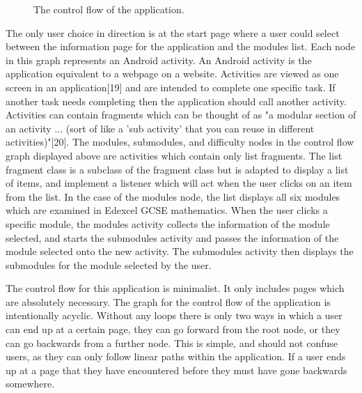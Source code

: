 \documentclass{article}
\begin{document}
\begin{figure}[H]
	\centering
	\caption{The control flow of the application.}
	\label{figure:applicationControlFlow}
\end{figure}

The only user choice in direction is at the start page where a user could select between the information page for the application and the modules list. Each node in this graph represents an Android activity. An Android activity is the application equivalent to a webpage on a website. Activities are viewed as one screen in an application[19] and are intended to complete one specific task. If another task needs completing then the application should call another activity. Activities can contain fragments which can be thought of as "a modular section of an activity ... (sort of like a 'sub activity' that you can reuse in different activities)"[20]. The modules, submodules, and difficulty nodes in the control flow graph displayed above are activities which contain only list fragments. The list fragment class is a subclass of the fragment class but is adapted to display a list of items, and implement a listener which will act when the user clicks on an item from the list. In the case of the modules node, the list displays all six modules which are examined in Edexcel GCSE mathematics. When the user clicks a specific module, the modules activity collects the information of the module selected, and starts the submodules activity and passes the information of the module selected onto the new activity. The submodules activity then displays the submodules for the module selected by the user. \par

The control flow for this application is minimalist. It only includes pages which are absolutely necessary. The graph for the control flow of the application is intentionally acyclic. Without any loops there is only two ways in which a user can end up at a certain page, they can go forward from the root node, or they can go backwards from a further node. This is simple, and should not confuse users, as they can only follow linear paths within the application. If a user ends up at a page that they have encountered before they must have gone backwards somewhere. \par
\end{document}
